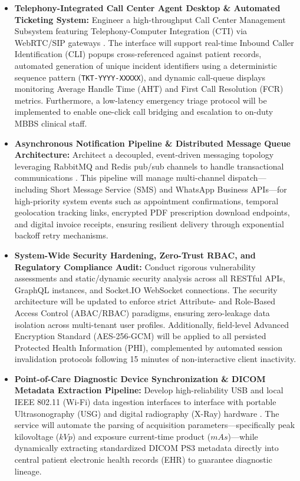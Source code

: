 \documentclass[onecolumn,journal]{IEEEtran}
\begin{document}
	\begin{itemize}
		\item \textbf{Telephony-Integrated Call Center Agent Desktop \& Automated Ticketing System:} Engineer a high-throughput Call Center Management Subsystem featuring Telephony-Computer Integration (CTI) via WebRTC/SIP gateways \cite{agorawebrtc}. The interface will support real-time Inbound Caller Identification (CLI) popups cross-referenced against patient records, automated generation of unique incident identifiers using a deterministic sequence pattern (\texttt{TKT-YYYY-XXXXX}), and dynamic call-queue displays monitoring Average Handle Time (AHT) and First Call Resolution (FCR) metrics. Furthermore, a low-latency emergency triage protocol will be implemented to enable one-click call bridging and escalation to on-duty MBBS clinical staff.
		
		\item \textbf{Asynchronous Notification Pipeline \& Distributed Message Queue Architecture:} Architect a decoupled, event-driven messaging topology leveraging RabbitMQ and Redis pub/sub channels to handle transactional communications \cite{catovic2022microservice}. This pipeline will manage multi-channel dispatch—including Short Message Service (SMS) and WhatsApp Business APIs—for high-priority system events such as appointment confirmations, temporal geolocation tracking links, encrypted PDF prescription download endpoints, and digital invoice receipts, ensuring resilient delivery through exponential backoff retry mechanisms.
		
		\item \textbf{System-Wide Security Hardening, Zero-Trust RBAC, and Regulatory Compliance Audit:} Conduct rigorous vulnerability assessments and static/dynamic security analysis across all RESTful APIs, GraphQL instances, and Socket.IO WebSocket connections. The security architecture will be updated to enforce strict Attribute- and Role-Based Access Control (ABAC/RBAC) paradigms, ensuring zero-leakage data isolation across multi-tenant user profiles. Additionally, field-level Advanced Encryption Standard (AES-256-GCM) will be applied to all persisted Protected Health Information (PHI), complemented by automated session invalidation protocols following 15 minutes of non-interactive client inactivity.
		
		\item \textbf{Point-of-Care Diagnostic Device Synchronization \& DICOM Metadata Extraction Pipeline:} Develop high-reliability USB and local IEEE 802.11 (Wi-Fi) data ingestion interfaces to interface with portable Ultrasonography (USG) and digital radiography (X-Ray) hardware \cite{dicom2021}. The service will automate the parsing of acquisition parameters—specifically peak kilovoltage ($kVp$) and exposure current-time product ($mAs$)—while dynamically extracting standardized DICOM PS3 metadata directly into central patient electronic health records (EHR) to guarantee diagnostic lineage.
		

\end{itemize}
\end{document}
